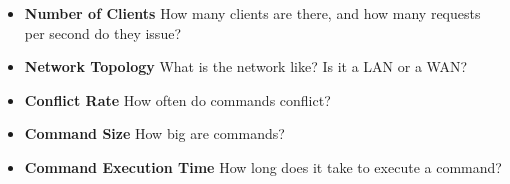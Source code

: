 \begin{itemize}
  \item \textbf{Number of Clients}
    How many clients are there, and how many requests per second do they issue?

  \item \textbf{Network Topology}
    What is the network like? Is it a LAN or a WAN?

  \item \textbf{Conflict Rate}
    How often do commands conflict?

  \item \textbf{Command Size}
    How big are commands?

  \item \textbf{Command Execution Time}
    How long does it take to execute a command?
\end{itemize}
